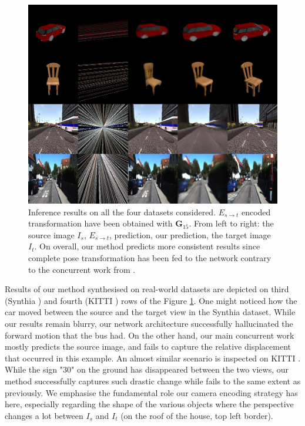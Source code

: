 \begin{figure}[h!]
    \begin{center}
    \includegraphics[width=.8\textwidth]{images/epipolarnvs/resultsFinal_BMVC.jpg}
    \end{center}
     \caption{Inference results on all the four datasets considered. $E_{s\xrightarrow{}t}$ encoded transformation have been obtained with $\textbf{G}_{15}$. From left to right: the source image  $I_s$, $E_{s\xrightarrow{}t}$, \citep{kim2020novel} prediction, our prediction, the target image $I_t$. On overall, our method predicts more consistent results since complete pose transformation has been fed to the network contrary to the concurrent work from \citep{kim2020novel}. }
     \label{fig:res_all}
\end{figure}

Results of our method synthesised on real-world datasets are depicted on third (Synthia \citep{ros2016synthia}) and fourth (KITTI \citep{geiger2012we}) rows of the Figure \ref{fig:res_all}. One might noticed how the car moved between the source and the target view in the Synthia \citep{ros2016synthia} dataset. While our results remain blurry, our network architecture successfully hallucinated the forward motion that the bus had. On the other hand, our main concurrent work mostly predicts the source image, and fails to capture the relative displacement that occurred in this example. An almost similar scenario is inspected on KITTI \citep{geiger2012we}. While the sign "30" on the ground has disappeared between the two views, our method successfully captures such drastic change while \citep{kim2020novel} fails to the same extent as previously. We emphasise the fundamental role our camera encoding strategy has here, especially regarding the shape of the various objects where the perspective changes a lot between $I_s$ and $I_t$ (on the roof of the house, top left border). \newline


